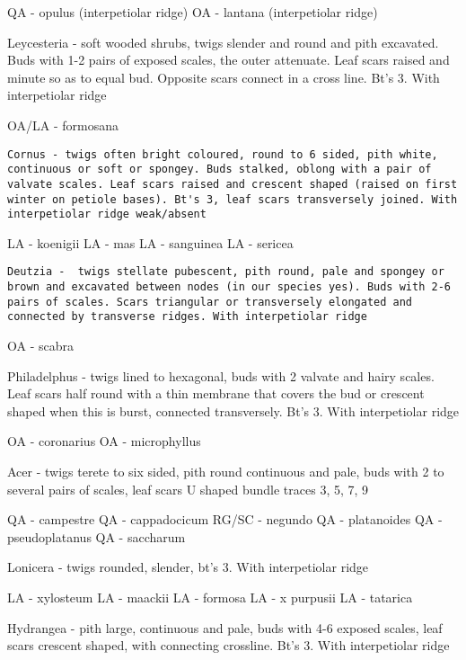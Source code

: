 \documentclass[openany]{book}
\begin{document}
QA - opulus (interpetiolar ridge) OA - lantana (interpetiolar ridge)

Leycesteria - soft wooded shrubs, twigs slender and round and pith
excavated. Buds with 1-2 pairs of exposed scales, the outer attenuate.
Leaf scars raised and minute so as to equal bud. Opposite scars connect
in a cross line. Bt's 3. With interpetiolar ridge

OA/LA - formosana

\begin{verbatim}
Cornus - twigs often bright coloured, round to 6 sided, pith white, continuous or soft or spongey. Buds stalked, oblong with a pair of valvate scales. Leaf scars raised and crescent shaped (raised on first winter on petiole bases). Bt's 3, leaf scars transversely joined. With interpetiolar ridge weak/absent
\end{verbatim}

LA - koenigii LA - mas LA - sanguinea LA - sericea

\begin{verbatim}
Deutzia -  twigs stellate pubescent, pith round, pale and spongey or brown and excavated between nodes (in our species yes). Buds with 2-6 pairs of scales. Scars triangular or transversely elongated and connected by transverse ridges. With interpetiolar ridge
\end{verbatim}

OA - scabra

Philadelphus - twigs lined to hexagonal, buds with 2 valvate and hairy
scales. Leaf scars half round with a thin membrane that covers the bud
or crescent shaped when this is burst, connected transversely. Bt's 3.
With interpetiolar ridge

OA - coronarius OA - microphyllus

Acer - twigs terete to six sided, pith round continuous and pale, buds
with 2 to several pairs of scales, leaf scars U shaped bundle traces 3,
5, 7, 9

QA - campestre QA - cappadocicum RG/SC - negundo QA - platanoides QA -
pseudoplatanus QA - saccharum

Lonicera - twigs rounded, slender, bt's 3. With interpetiolar ridge

LA - xylosteum LA - maackii LA - formosa LA - x purpusii LA - tatarica

Hydrangea - pith large, continuous and pale, buds with 4-6 exposed
scales, leaf scars crescent shaped, with connecting crossline. Bt's 3.
With interpetiolar ridge
\end{document}

